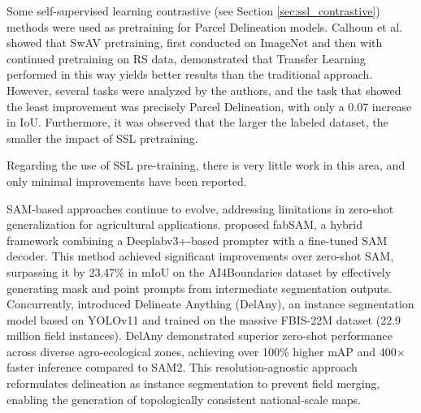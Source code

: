 Some self-supervised learning contrastive (see Section \ref{sec:ssl_contrastive}) methods were used as pretraining for Parcel Delineation models. Calhoun et al. \citep{calhoun2022self} showed that SwAV pretraining, first conducted on ImageNet and then with continued pretraining on \ac{RS} data, demonstrated that Transfer Learning performed in this way yields better results than the traditional approach. However, several tasks were analyzed by the authors, and the task that showed the least improvement was precisely Parcel Delineation, with only a 0.07 increase in \ac{IoU}. Furthermore, it was observed that the larger the labeled dataset, the smaller the impact of \ac{SSL} pretraining.

 Regarding the use of \ac{SSL} pre-training, there is very little work in this area, and only minimal improvements have been reported.

\ac{SAM}-based approaches continue to evolve, addressing limitations in zero-shot generalization for agricultural applications. \cite{xie2025fabsamfarmlandboundarydelineation} proposed fabSAM, a hybrid framework combining a Deeplabv3+-based prompter with a fine-tuned \ac{SAM} decoder. This method achieved significant improvements over zero-shot \ac{SAM}, surpassing it by 23.47\% in \ac{mIoU} on the AI4Boundaries dataset by effectively generating mask and point prompts from intermediate segmentation outputs. Concurrently, \cite{lavreniuk2025delineateflowfastcountrylevel} introduced Delineate Anything (DelAny), an instance segmentation model based on YOLOv11 and trained on the massive FBIS-22M dataset (22.9 million field instances). DelAny demonstrated superior zero-shot performance across diverse agro-ecological zones, achieving over 100\% higher \ac{mAP} and 400$\times$ faster inference compared to SAM2. This resolution-agnostic approach reformulates delineation as instance segmentation to prevent field merging, enabling the generation of topologically consistent national-scale maps.

